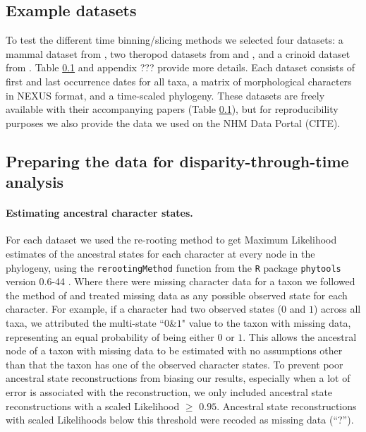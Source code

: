 \documentclass[12pt,a4paper]{article}
\begin{document}
\subsection{Example datasets}
\label{datasets}
To test the different time binning/slicing methods we selected four datasets: a mammal dataset from \cite{beckancient2014}, two theropod datasets from \cite{brusatte2014gradual} and \cite{bapst2016topology}, and a crinoid dataset from \cite{wright2017bayesian}.
Table \ref{datasets} and appendix ??? provide more details. %
Each dataset consists of first and last occurrence dates for all taxa, a matrix of morphological characters in NEXUS format, and a time-scaled phylogeny. 
These datasets are freely available with their accompanying papers (Table \ref{datasets}), but for reproducibility purposes we also provide the data we used on the NHM Data Portal (CITE).

     
    \label{datasets}  

\subsection{Preparing the data for disparity-through-time analysis}
\label{ace}

\paragraph{Estimating ancestral character states.}
For each dataset we used the re-rooting method \citep{Yang01121995,Garland2000} to get Maximum Likelihood estimates of the ancestral states for each character at every node in the phylogeny, using the \texttt{rerootingMethod} function from the \texttt{R} package \texttt{phytools} version 0.6-44 \citep{phytools,R}.
Where there were missing character data for a taxon we followed the method of \cite{Claddis} and treated missing data as any possible observed state for each character.
For example, if a character had two observed states ($0$ and $1$) across all taxa, we attributed the multi-state ``$0$\&$1$" value to the taxon with missing data, representing an equal probability of being either $0$ or $1$.
This allows the ancestral node of a taxon with missing data to be estimated with no assumptions other than that the taxon has one of the observed character states.
To prevent poor ancestral state reconstructions from biasing our results, especially when a lot of error is associated with the reconstruction, we only included ancestral state reconstructions with a scaled Likelihood $\geq$ $0.95$.
Ancestral state reconstructions with scaled Likelihoods below this threshold were recoded as missing data (``?'').
\end{document}
